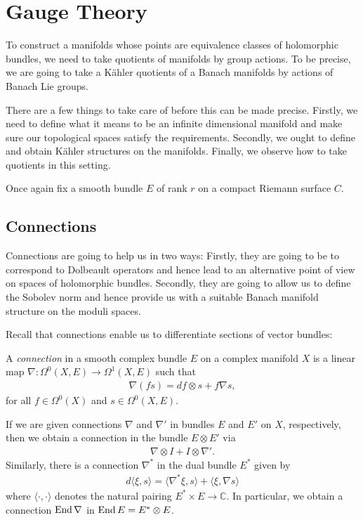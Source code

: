 \documentclass[12pt]{ociamthesis}  %
\begin{document}
\section{Gauge Theory}

To construct a manifolds whose points are equivalence classes of
holomorphic bundles, we need to take quotients of manifolds by
group actions. To be precise, we are going to take a K\"ahler
quotients of a Banach manifolds by actions of Banach Lie groups.

There are a few things to take care of before this can be made
precise. Firstly, we need to define what it means to be an infinite
dimensional manifold and make sure our topological spaces satisfy
the requirements. Secondly, we ought to define and obtain K\"ahler
structures on the manifolds. Finally, we observe how to take quotients
in this setting.

Once again fix a smooth bundle $E$ of rank $r$ on a compact
Riemann surface $C$.

\subsection{Connections}

Connections are going to help us in two ways: Firstly, they are going to
be to correspond to Dolbeault operators and hence lead to an
alternative point of view on spaces of holomorphic bundles.
Secondly, they are going to allow us to define the Sobolev norm and
hence provide us with a suitable Banach manifold structure on
the moduli spaces.

Recall that connections enable us to differentiate sections of
vector bundles:

\begin{definition}
  A \emph{connection} in a smooth complex bundle $E$ on
  a complex manifold $X$ is a linear map $\nabla : \Omega^0(X,E) \to \Omega^1(X,E)$
  such that
  \begin{align*}
    \nabla (fs) = df \otimes s + f\nabla s,
  \end{align*}
  for all $f\in \Omega^0(X)$ and $s\in\Omega^0(X,E)$.
\end{definition}

\begin{example}
  If we are given connections $\nabla$ and $\nabla'$ in bundles $E$ and $E'$ on $X$,
  respectively, then we obtain a connection in the bundle $E\otimes E'$ via
  \begin{align*}
    \nabla \otimes I + I \otimes \nabla'.
  \end{align*}
  Similarly, there is a connection $\nabla^*$ in the dual bundle $E^*$ given by
  \begin{align*}
    d\langle \xi,s\rangle
    = \langle \nabla^*\xi, s \rangle + \langle \xi,\nabla s\rangle
  \end{align*}
  where $\langle\cdot,\cdot\rangle$ denotes the natural pairing $E^*\times E\to\mathbb{C}$.
  In particular, we obtain a connection $\operatorname{End}\nabla$ in $\operatorname{End} E = E^* \otimes E$.
\end{example}
\end{document}
